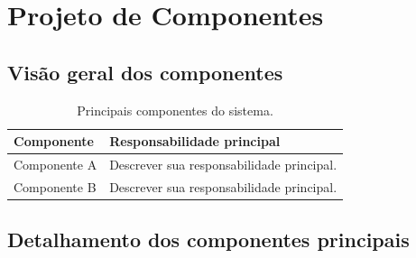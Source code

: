 \documentclass[a4paper,12pt,oneside,openany]{book}
\newif\iforientacoes
\newcommand{\orientacao}[1]{%
    \iforientacoes
        \begin{quote}
        \small\itshape\textbf{Orientação:} #1
        \end{quote}
    \fi
}
\begin{document}
\orientacao{Registrem restrições que limitem as decisões de arquitetura ou
implementação, como tecnologias obrigatórias, integrações com sistemas
existentes, ambiente de execução, restrições organizacionais ou convenções.
Incluam apenas restrições efetivamente relevantes ao projeto.}

\chapter{Projeto de Componentes}

\orientacao{Detalhem a organização interna das partes mais relevantes do
sistema. O projeto de componentes pode ser representado graficamente,
textualmente ou por tabelas, de acordo com a natureza da solução.}

\section{Visão geral dos componentes}

\orientacao{Listem os principais componentes e suas responsabilidades. Para
sistemas maiores, esta visão geral pode cobrir todos os componentes, enquanto
o detalhamento das seções seguintes pode se concentrar apenas nos mais
relevantes ou complexos.}

\begin{table}[ht]
\centering
\caption{Principais componentes do sistema.}
\begin{tabularx}{0.95\textwidth}{p{} X}
\toprule
\textbf{Componente} & \textbf{Responsabilidade principal} \\
\midrule
Componente A & Descrever sua responsabilidade principal. \\
Componente B & Descrever sua responsabilidade principal. \\
\bottomrule
\end{tabularx}
\end{table}

\section{Detalhamento dos componentes principais}

\orientacao{Selecionem os componentes mais relevantes ou complexos e
apresentem sua estrutura, responsabilidades, interfaces e dependências.
Se o projeto for orientado a objetos, utilizem principalmente diagramas de
classes UML e, quando necessário, complementem-nos com diagramas de sequência,
atividade ou outros artefatos.}
\end{document}

